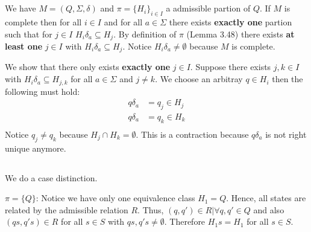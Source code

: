 \documentclass[a4paper,12pt,numbers=noenddot]{scrreport}
\begin{document}

\setcounter{chapter}{4}
\chapter{}
\section{}
We have $M = (Q, \Sigma, \delta)$ and $\pi = \{H_i\}_{i \in I}$ a admissible partion of $Q$.
If $M$ is complete then for all $i \in I$ and for all $a \in \Sigma$ there exists \textbf{exactly one} partion such that for $j \in I$ $H_i\delta_a \subseteq H_j$.
By definition of $\pi$ (Lemma 3.48) there exists \textbf{at least one} $j \in I$ with $H_i\delta_a \subseteq H_j$.
Notice $H_i\delta_a \neq \emptyset$ because $M$ is complete.

We show that there only exists \textbf{exactly one} $j \in I$.
Suppose there exists $j,k \in I$ with $H_i\delta_a \subseteq H_{j,k}$ for all $a \in \Sigma$ and $j \neq k$.
We choose an arbitray $q \in H_i$ then the following must hold:
\begin{align*}
    q\delta_a &= q_j \in H_j \\
    q\delta_a &= q_k \in H_k \\
\end{align*}
Notice $q_j \neq q_k$ because $H_j \cap H_k = \emptyset$.
This is a contraction because $q\delta_a$ is not right unique anymore.

\section{}
We do a case distinction.

$\pi = \{Q\}$:
Notice we have only one equivalence class $H_1 = Q$.
Hence, all states are related by the admissible relation $R$.
Thus, $(q,q') \in R | \forall q,q' \in Q$ and also $(qs, q's) \in R$ for all $s \in S$ with $qs,q's \neq \emptyset$.
Therefore $H_1s = H_1$ for all $s \in S$.
\end{document}
